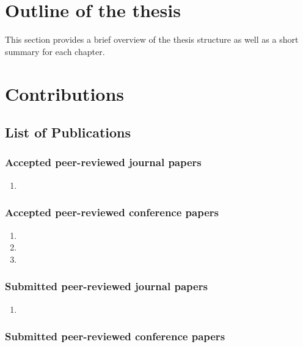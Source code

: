 \section{Outline of the thesis}
This section provides a brief overview of the thesis structure as well as a short summary for each chapter.

\section{Contributions}
\subsection{List of Publications}
\subsubsection{Accepted peer-reviewed journal papers}
\begin{enumerate}
	\item {}
\end{enumerate}

\subsubsection{Accepted peer-reviewed conference papers}
\begin{enumerate}
	\item {}
	\item {}
	\item {}
\end{enumerate}

\subsubsection{Submitted peer-reviewed journal papers}
\begin{enumerate}
	\item {}
\end{enumerate}


\subsubsection{Submitted peer-reviewed conference papers}
